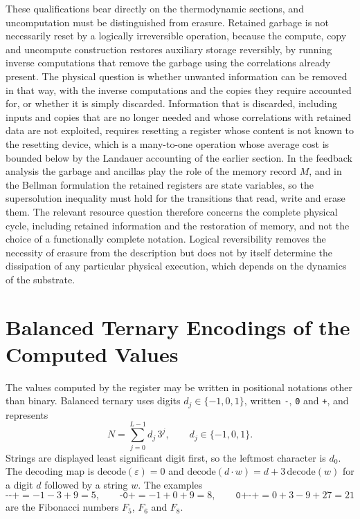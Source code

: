\documentclass[11pt]{article}
\theoremstyle{definition}
\theoremstyle{remark}
\newcommand{\bt}[1]{\texttt{#1}}
\begin{document}
These qualifications bear directly on the thermodynamic sections, and uncomputation must be distinguished from erasure. Retained garbage is not necessarily reset by a logically irreversible operation, because the compute, copy and uncompute construction restores auxiliary storage reversibly, by running inverse computations that remove the garbage using the correlations already present. The physical question is whether unwanted information can be removed in that way, with the inverse computations and the copies they require accounted for, or whether it is simply discarded. Information that is discarded, including inputs and copies that are no longer needed and whose correlations with retained data are not exploited, requires resetting a register whose content is not known to the resetting device, which is a many-to-one operation whose average cost is bounded below by the Landauer accounting of the earlier section. In the feedback analysis the garbage and ancillas play the role of the memory record $M$, and in the Bellman formulation the retained registers are state variables, so the supersolution inequality must hold for the transitions that read, write and erase them. The relevant resource question therefore concerns the complete physical cycle, including retained information and the restoration of memory, and not the choice of a functionally complete notation. Logical reversibility removes the necessity of erasure from the description but does not by itself determine the dissipation of any particular physical execution, which depends on the dynamics of the substrate.

\section{Balanced Ternary Encodings of the Computed Values}\label{sec:bt}

The values computed by the register may be written in positional notations other than binary. Balanced ternary uses digits $d_j \in \{-1, 0, 1\}$, written \bt{-}, \bt{0} and \bt{+}, and represents
\[
N = \sum_{j=0}^{L-1} d_j\,3^{j}, \qquad d_j \in \{-1, 0, 1\}.
\]
Strings are displayed least significant digit first, so the leftmost character is $d_0$. The decoding map is $\mathrm{decode}(\varepsilon) = 0$ and $\mathrm{decode}(d \cdot w) = d + 3\,\mathrm{decode}(w)$ for a digit $d$ followed by a string $w$. The examples
\[
\bt{-{}-+} = -1 - 3 + 9 = 5, \qquad \bt{-0+} = -1 + 0 + 9 = 8, \qquad \bt{0+-+} = 0 + 3 - 9 + 27 = 21
\]
are the Fibonacci numbers $F_5$, $F_6$ and $F_8$.
\end{document}
